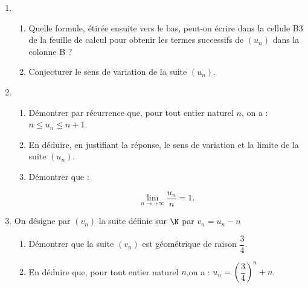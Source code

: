 \begin{enumerate}[resume]
\item
	\begin{enumerate}
		\item Quelle formule, étirée ensuite vers le bas, peut-on écrire dans la cellule B3 de la feuille de calcul pour obtenir les termes successifs de $\left(u_n\right)$ dans la colonne B ?
		\item Conjecturer le sens de variation de la suite $\left(u_n\right)$.
	\end{enumerate}
\item
	\begin{enumerate}
		\item Démontrer par récurrence que, pour tout entier naturel $n$, on a : $n \leqslant u_n \leqslant n + 1$.
		\item En déduire, en justifiant la réponse, le sens de variation et la limite de la suite 
		$\left(u_n\right)$.
		\item Démontrer que :
		
\[\displaystyle\lim_{n \to + \infty} \dfrac{u_n}{n} = 1.\]

	\end{enumerate}
\item  On désigne par $\left(v_n\right)$ la suite définie sur $\N$ par $v_n = u_n - n$
	\begin{enumerate}
		\item Démontrer que la suite $\left(v_n\right)$ est géométrique de raison $\dfrac{3}{4}$.
		\item En déduire que, pour tout entier naturel $n$,on a : $u_n = \left(\dfrac{3}{4}\right)^n + n$.
	\end{enumerate}
\end{enumerate}

\bigskip

